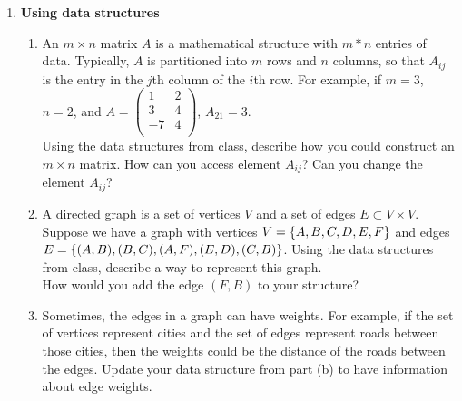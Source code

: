 \documentclass{article}
\begin{document}
\pagestyle{fancy}
\begin{enumerate}

\item \textbf{Using data structures}
\begin{enumerate}
\item An $m \times n$ matrix $A$ is a mathematical structure with $m * n$ entries of data.  Typically, $A$ is partitioned into $m$ rows and $n$ columns, so that $A_{ij}$ is the entry in the $j$th column of the $i$th row.  For example, if $m = 3$, $n = 2$, and $A = \begin{pmatrix} 1 & 2 \\ 3 & 4 \\ -7 & 4 \\ \end{pmatrix}$, $A_{21} = 3$. \\

Using the data structures from class, describe how you could construct an $m \times n$ matrix.  How can you access element $A_{ij}$?  Can you change the element $A_{ij}$?
\end{enumerate}

\begin{enumerate}
\setcounter{enumii}{1}
\item A directed graph is a set of vertices $V$ and a set of edges $E \subset V \times V$.  Suppose we have a graph with vertices $V = \{A, B, C, D, E, F\}$ and edges $E = \{(A, B), (B, C), (A, F), (E, D), (C, B)\}$.  Using the data structures from class, describe a way to represent this graph. \\

How would you add the edge $(F, B)$ to your structure?
\end{enumerate}

\begin{enumerate}
\setcounter{enumii}{2}
\item Sometimes, the edges in a graph can have weights.  For example, if the set of vertices represent cities and the set of edges represent roads between those cities, then the weights could be the distance of the roads between the edges. Update your data structure from part (b) to have information about edge weights.

\end{enumerate}



\end{enumerate}
\end{document}
